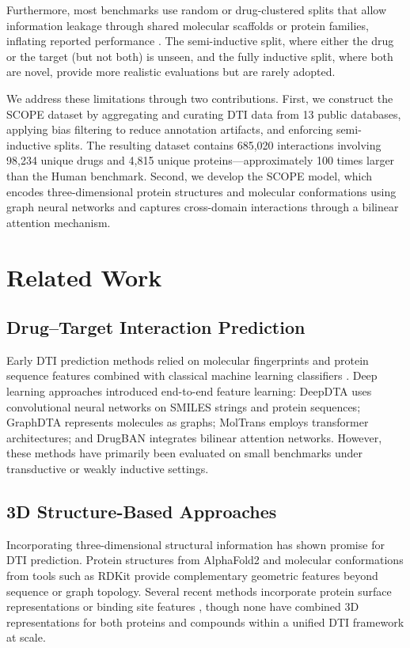 \documentclass[11pt]{article}
\begin{document}
Furthermore, most benchmarks use random or drug-clustered splits that allow information leakage through shared molecular scaffolds or protein families, inflating reported performance \citep{yang2019}. The semi-inductive split, where either the drug or the target (but not both) is unseen, and the fully inductive split, where both are novel, provide more realistic evaluations but are rarely adopted.

We address these limitations through two contributions. First, we construct the SCOPE dataset by aggregating and curating DTI data from 13 public databases, applying bias filtering to reduce annotation artifacts, and enforcing semi-inductive splits. The resulting dataset contains 685,020 interactions involving 98,234 unique drugs and 4,815 unique proteins---approximately 100 times larger than the Human benchmark. Second, we develop the SCOPE model, which encodes three-dimensional protein structures and molecular conformations using graph neural networks and captures cross-domain interactions through a bilinear attention mechanism.

\section{Related Work}

\subsection{Drug--Target Interaction Prediction}

Early DTI prediction methods relied on molecular fingerprints and protein sequence features combined with classical machine learning classifiers \citep{yamanishi2008}. Deep learning approaches introduced end-to-end feature learning: DeepDTA \citep{ozturk2018} uses convolutional neural networks on SMILES strings and protein sequences; GraphDTA \citep{nguyen2021} represents molecules as graphs; MolTrans \citep{huang2021moltrans} employs transformer architectures; and DrugBAN \citep{bai2023} integrates bilinear attention networks. However, these methods have primarily been evaluated on small benchmarks under transductive or weakly inductive settings.

\subsection{3D Structure-Based Approaches}

Incorporating three-dimensional structural information has shown promise for DTI prediction. Protein structures from AlphaFold2 \citep{jumper2021} and molecular conformations from tools such as RDKit provide complementary geometric features beyond sequence or graph topology. Several recent methods incorporate protein surface representations \citep{gainza2020} or binding site features \citep{volkov2022}, though none have combined 3D representations for both proteins and compounds within a unified DTI framework at scale.
\end{document}
